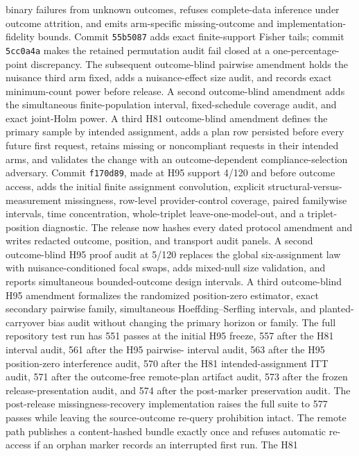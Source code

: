 \documentclass[11pt]{article}
\newcommand{\1}{\mathbf{1}}
\begin{document}
binary failures from unknown outcomes, refuses complete-data inference under
outcome attrition, and emits arm-specific missing-outcome and implementation-
fidelity bounds.  Commit \texttt{55b5087} adds exact finite-support Fisher
tails; commit \texttt{5cc0a4a} makes the retained permutation audit fail closed
at a one-percentage-point discrepancy.  The subsequent outcome-blind pairwise
amendment holds the nuisance third arm fixed, adds a nuisance-effect size audit,
and records exact minimum-count power before release.  A second outcome-blind
amendment adds the simultaneous finite-population interval, fixed-schedule
coverage audit, and exact joint-Holm power.  A third H81 outcome-blind amendment
defines the primary sample by intended assignment, adds a plan row persisted
before every future first request, retains missing or noncompliant requests in
their intended arms, and validates the change with an outcome-dependent
compliance-selection adversary.  Commit \texttt{f170d89}, made at H95
support 4/120 and before outcome access, adds the initial finite assignment
convolution, explicit structural-versus-measurement missingness, row-level
provider-control coverage, paired familywise intervals, time concentration,
whole-triplet leave-one-model-out, and a triplet-position diagnostic.  The
release now hashes every dated protocol amendment and writes redacted outcome,
position, and transport audit panels.  A second outcome-blind H95 proof audit at
5/120 replaces the global six-assignment law with nuisance-conditioned focal
swaps, adds mixed-null size validation, and reports simultaneous bounded-outcome
design intervals.  A third outcome-blind H95 amendment formalizes the randomized
position-zero estimator, exact secondary pairwise family, simultaneous
Hoeffding--Serfling intervals, and planted-carryover bias audit without changing
the primary horizon or family.  The full repository test run has 551 passes at the initial
H95 freeze, 557 after the H81 interval audit, 561 after the H95 pairwise-
interval audit, 563 after the H95 position-zero interference audit, 570
after the H81 intended-assignment ITT audit, 571 after the outcome-free
remote-plan artifact audit, 573 after the frozen release-presentation audit,
and 574 after the post-marker preservation audit.  The
post-release missingness-recovery implementation raises the full suite to 577
passes while leaving the source-outcome re-query prohibition intact.  The
remote path publishes a content-hashed
bundle exactly once and refuses automatic
re-access if an orphan marker records an interrupted first run.  The H81
\end{document}
